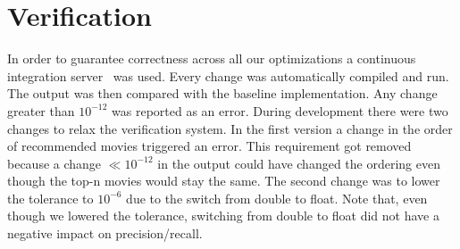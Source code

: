 \section{Verification}\label{sec:verification}
In order to guarantee correctness across all our optimizations a continuous integration server~\cite{jenkins} was used. Every change was automatically compiled and run. The output was then compared with the baseline implementation. Any change greater than $10^{-12}$ was reported as an error. During development there were two changes to relax the verification system. In the first version a change in the order of recommended movies triggered an error. This requirement got removed because a change $ \ll 10^{-12}$ in the output could have changed the ordering even though the top-n movies would stay the same. The second change was to lower the tolerance to $10^{-6}$ due to the switch from double to float. Note that, even though we lowered the tolerance, switching from double to float did not have a negative impact on precision/recall.
